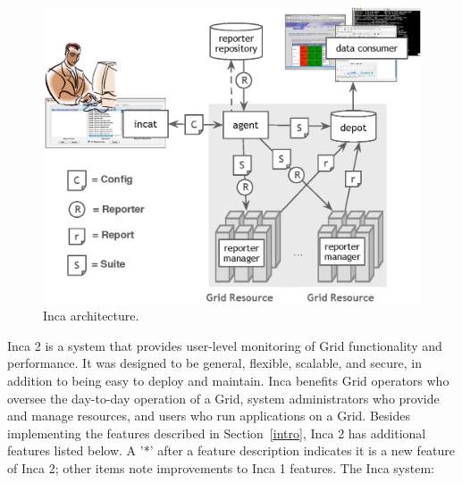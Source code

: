 \documentclass{sig-alternate}
\begin{document}
\begin{figure}[tbp]
  \centering
  \includegraphics[width=.6\textwidth]{arch.eps}
  \caption{\label{arch_fig} Inca architecture.}
\end{figure}

Inca 2 is a system that provides user-level monitoring of Grid functionality
and performance.  It was designed to be
general, flexible, scalable, and secure, in addition to being easy to deploy
and maintain.  Inca benefits Grid operators who oversee the day-to-day
operation of a Grid, system administrators who provide and manage resources,
and users who run applications on a Grid.  Besides implementing the features
described in Section~\ref{intro}, Inca 2 has additional features
listed below.  A '*' after a feature description indicates it is a new
feature of Inca 2; other items note improvements to Inca 1 features.  The 
Inca system:
\end{document}
